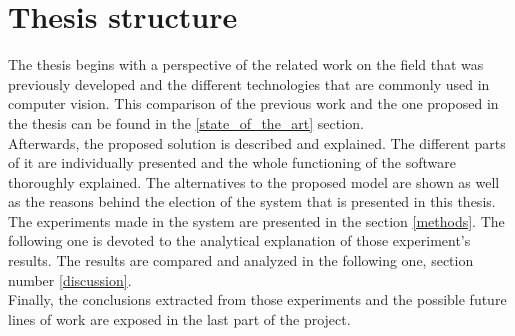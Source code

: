 \section{Thesis structure}

The thesis begins with a perspective of the related work on the field that was previously developed and the different technologies that are commonly used in computer vision. This comparison of the previous work and the one proposed in the thesis can be found in the \ref{state_of_the_art} section. 
\\

Afterwards, the proposed solution is described and explained. The different parts of it are individually presented and the whole functioning of the software thoroughly explained. The alternatives to the proposed model are shown as well as the reasons behind the election of the system that is presented in this thesis. 
\\

The experiments made in the system are presented in the section \ref{methods}. The following one is devoted to the analytical explanation of those experiment's results. 
The results are compared and analyzed in the following one, section number \ref{discussion}. 
\\

Finally, the conclusions extracted from those experiments and the possible future lines of work are exposed in the last part of the project. 
